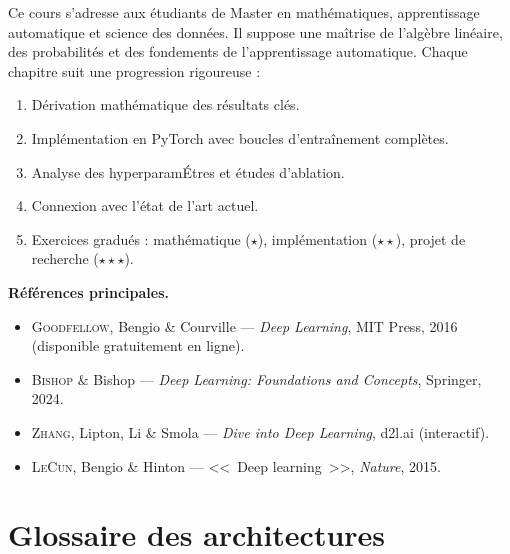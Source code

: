 \documentclass[12pt,a4paper,twoside]{book}
\theoremstyle{definition}
\theoremstyle{plain}
\theoremstyle{remark}
\begin{document}
\medskip
Ce cours s'adresse aux \'etudiants de Master en math\'ematiques, apprentissage automatique et science des donn\'ees. Il suppose une ma\^itrise de l'alg\`ebre lin\'eaire, des probabilit\'es et des fondements de l'apprentissage automatique. Chaque chapitre suit une progression rigoureuse :
\begin{enumerate}
\item D\'erivation math\'ematique des r\'esultats cl\'es.
\item Impl\'ementation en PyTorch avec boucles d'entra\^inement compl\`etes.
\item Analyse des hyperparamÉtres et \'etudes d'ablation.
\item Connexion avec l'\'etat de l'art actuel.
\item Exercices gradu\'es : math\'ematique ($\star$), impl\'ementation ($\star\star$), projet de recherche ($\star\star\star$).
\end{enumerate}

\medskip
\textbf{R\'ef\'erences principales.}
\begin{itemize}
\item \textsc{Goodfellow}, Bengio \& Courville --- \emph{Deep Learning}, MIT Press, 2016 (disponible gratuitement en ligne).
\item \textsc{Bishop} \& Bishop --- \emph{Deep Learning: Foundations and Concepts}, Springer, 2024.
\item \textsc{Zhang}, Lipton, Li \& Smola --- \emph{Dive into Deep Learning}, d2l.ai (interactif).
\item \textsc{LeCun}, Bengio \& Hinton --- <<~Deep learning~>>, \emph{Nature}, 2015.
\end{itemize}

\mainmatter














\backmatter
\appendix
\chapter{Glossaire des architectures}
\label{app:glossaire}
\end{document}
